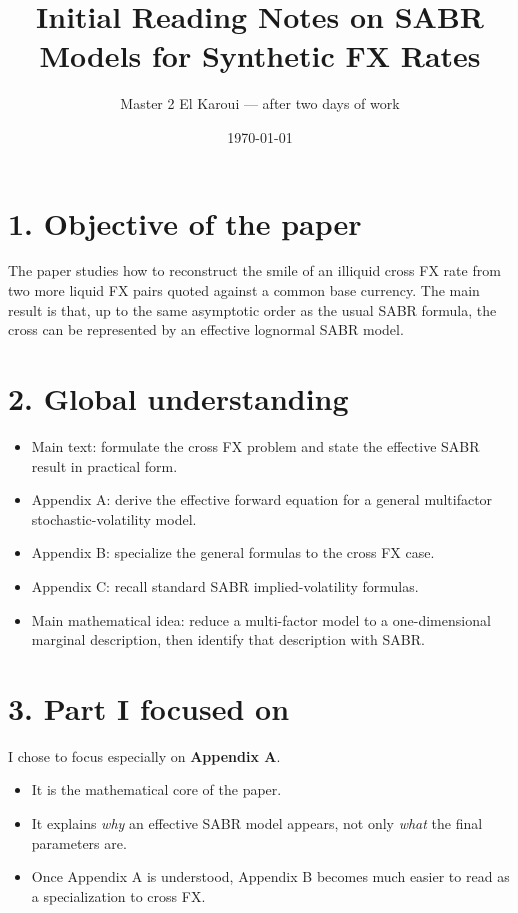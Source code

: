 \documentclass[11pt]{article}
\title{\textbf{Initial Reading Notes on SABR Models for Synthetic FX Rates}}
\author{Master 2 El Karoui --- after two days of work}
\date{\today}
\begin{document}
\maketitle

\section*{1. Objective of the paper}

The paper studies how to reconstruct the smile of an illiquid cross FX rate from two more liquid FX pairs quoted against a common base currency. The main result is that, up to the same asymptotic order as the usual SABR formula, the cross can be represented by an effective lognormal SABR model.

\section*{2. Global understanding}

\begin{itemize}
    \item Main text: formulate the cross FX problem and state the effective SABR result in practical form.
    \item Appendix A: derive the effective forward equation for a general multifactor stochastic-volatility model.
    \item Appendix B: specialize the general formulas to the cross FX case.
    \item Appendix C: recall standard SABR implied-volatility formulas.
    \item Main mathematical idea: reduce a multi-factor model to a one-dimensional marginal description, then identify that description with SABR.
\end{itemize}

\section*{3. Part I focused on}

I chose to focus especially on \textbf{Appendix A}.

\begin{itemize}
    \item It is the mathematical core of the paper.
    \item It explains \emph{why} an effective SABR model appears, not only \emph{what} the final parameters are.
    \item Once Appendix A is understood, Appendix B becomes much easier to read as a specialization to cross FX.
\end{itemize}
\end{document}
